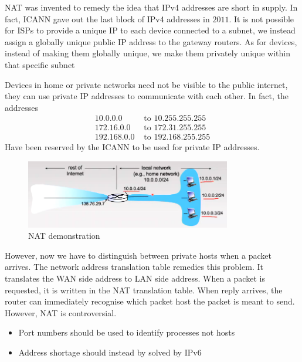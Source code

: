 \documentclass[a4paper]{article}
\theoremstyle{plain}
\theoremstyle{definition}
\newtheorem{defn}{Definition}[section]
\theoremstyle{remark}
\begin{document}
\begin{tcolorbox}[colback=black!3!white,colframe=black!60!white,title=\begin{defn}Network Address Translation (NAT) \label{Network Address Translation (NAT)}\end{defn}]
NAT was invented to remedy the idea that IPv4 addresses are short in supply. In fact, ICANN gave out the last block of IPv4 addresses in $2011$. It is not possible for ISPs to provide a unique IP to each device connected to a subnet, we instead assign a globally unique public IP address to the gateway routers. As for devices, instead of making them globally unique, we make them privately unique within that specific subnet
\end{tcolorbox}
\begin{tcolorbox}[colback=black!3!white,colframe=black!60!white,title=\begin{defn}Public and private IP addresses \label{Public and private IP addresses}\end{defn}]
Devices in home or private networks need not be visible to the public internet, they can use private IP addresses to communicate with each other. In fact, the addresses
\begin{align*}
	10.0.0.0 &\text{ to } 10.255.255.255 \\
	172.16.0.0 &\text{ to } 172.31.255.255 \\
	192.168.0.0 &\text{ to } 192.168.255.255
\end{align*}
Have been reserved by the ICANN to be used for private IP addresses. 
\begin{figure}[H]
	\centering
	\includegraphics[width=0.8\textwidth]{seventynine.png}
	\caption{NAT demonstration}
	\label{fig:seventynine-png}
\end{figure}
However, now we have to distinguish between private hosts when a packet arrives. The network address translation table remedies this problem. It translates the WAN side address to LAN side address. When a packet is requested, it is written in the NAT translation table. When reply arrives, the router can immediately recognise which packet host the packet is meant to send. However, NAT is controversial.
\begin{itemize}
	\item Port numbers should be used to identify processes not hosts
	\item Address shortage should instead by solved by IPv6
\end{itemize}
\end{tcolorbox}
\end{document}
